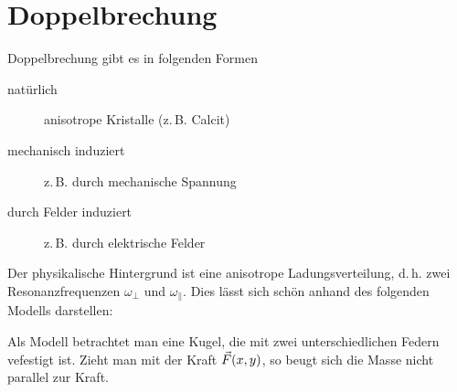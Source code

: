 \section{Doppelbrechung} \label{doppelbrechung}
Doppelbrechung gibt es in folgenden Formen
\begin{description}
\item[natürlich] anisotrope Kristalle (z.\,B. Calcit)
\item[mechanisch induziert] z.\,B. durch mechanische Spannung
\item[durch Felder induziert] z.\,B. durch elektrische Felder
\end{description}
Der physikalische Hintergrund ist eine anisotrope Ladungsverteilung,
d.\,h. zwei Resonanzfrequenzen $\omega_\bot$ und $\omega_\parallel$.
Dies lässt sich schön anhand des folgenden Modells darstellen:

Als Modell betrachtet man eine Kugel, die mit zwei unterschiedlichen
Federn vefestigt ist.
Zieht man mit der Kraft $\vec{F}(x,y)$, so beugt sich die Masse nicht
parallel zur Kraft.

